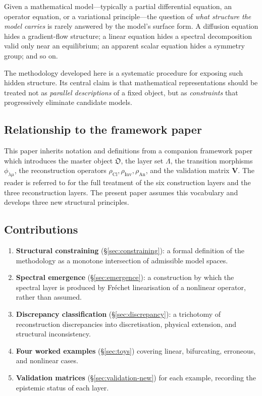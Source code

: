 \documentclass[11pt,a4paper]{article}
\theoremstyle{definition}
\theoremstyle{plain}
\newcommand{\Lam}{\Lambda}
\newcommand{\Cl}{\mathrm{Cl}}
\newcommand{\Inv}{\mathrm{Inv}}
\newcommand{\An}{\mathrm{An}}
\newcommand{\Ob}{\mathfrak{O}}
\newcommand{\philam}{\phi_{\lambda\mu}}
\newcommand{\Vmat}{\mathbf{V}}
\begin{document}
Given a mathematical model---typically a partial differential
equation, an operator equation, or a variational principle---the
question of \emph{what structure the model carries} is rarely
answered by the model's surface form. A diffusion equation hides a
gradient-flow structure; a linear equation hides a spectral
decomposition valid only near an equilibrium; an apparent scalar
equation hides a symmetry group; and so on.

The methodology developed here is a systematic procedure for
exposing such hidden structure. Its central claim is that
mathematical representations should be treated not as
\emph{parallel descriptions} of a fixed object, but as
\emph{constraints} that progressively eliminate candidate models.

\subsection{Relationship to the framework paper}

This paper inherits notation and definitions from a companion
framework paper \cite{framework} which introduces the master object
$\Ob$, the layer set $\Lam$, the transition morphisms $\philam$, the
reconstruction operators $\rho_\Cl, \rho_\Inv, \rho_\An$, and the
validation matrix $\Vmat$. The reader is referred to \cite{framework}
for the full treatment of the six construction layers and the three
reconstruction layers. The present paper assumes this vocabulary and
develops three new structural principles.

\subsection{Contributions}

\begin{enumerate}[label=(\roman*)]
  \item \textbf{Structural constraining} (\S\ref{sec:constraining}):
        a formal definition of the methodology as a monotone
        intersection of admissible model spaces.
  \item \textbf{Spectral emergence} (\S\ref{sec:emergence}): a
        construction by which the spectral layer is produced by
        Fr\'echet linearisation of a nonlinear operator, rather than
        assumed.
  \item \textbf{Discrepancy classification} (\S\ref{sec:discrepancy}):
        a trichotomy of reconstruction discrepancies into
        discretisation, physical extension, and structural
        inconsistency.
  \item \textbf{Four worked examples} (\S\ref{sec:toys}) covering
        linear, bifurcating, erroneous, and nonlinear cases.
  \item \textbf{Validation matrices} (\S\ref{sec:validation-new})
        for each example, recording the epistemic status of each
        layer.
\end{enumerate}
\end{document}
